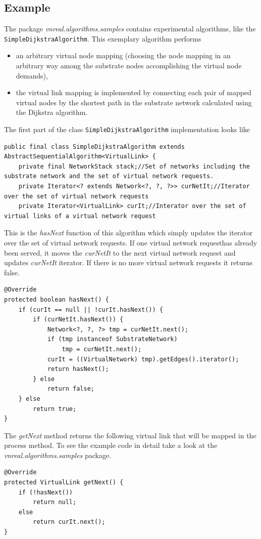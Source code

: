 \subsection{Example}
The package \textit{vnreal.algorithms.samples} contains experimental algorithms, like the \texttt{Simple\-Dijkstra\-Algorithm}. This exemplary algorithm performs
\begin{itemize}
	\item an arbitrary virtual node mapping (choosing the node mapping in an arbitrary way among the substrate nodes accomplishing the virtual node demands), 
	\item the virtual link mapping is implemented by connecting each pair of mapped virtual nodes by the shortest path in the substrate network calculated using the Dijkstra algorithm.
\end{itemize}
The first part of the class \texttt{SimpleDijkstraAlgorithm} implementation looks like
\begin{lstlisting}
public final class SimpleDijkstraAlgorithm extends AbstractSequentialAlgorithm<VirtualLink> {
	private final NetworkStack stack;//Set of networks including the substrate network and the set of virtual network requests.
	private Iterator<? extends Network<?, ?, ?>> curNetIt;//Iterator over the set of virtual network requests
	private Iterator<VirtualLink> curIt;//Interator over the set of virtual links of a virtual network request 
\end{lstlisting}
This is the \textsl{hasNext} function of this algorithm which simply updates the iterator over the set of virtual network requests. If one virtual network requesthas already been served, it moves the \textsl{curNetIt} to the next virtual network request and updates \textsl{curNetIt} iterator. If there is no more virtual network requests it returns false. 
\begin{lstlisting}
@Override
protected boolean hasNext() {
	if (curIt == null || !curIt.hasNext()) {
		if (curNetIt.hasNext()) {
			Network<?, ?, ?> tmp = curNetIt.next();
			if (tmp instanceof SubstrateNetwork)
				tmp = curNetIt.next();
			curIt = ((VirtualNetwork) tmp).getEdges().iterator();
			return hasNext();
		} else
			return false;
	} else
		return true;
}
\end{lstlisting}
The \textsl{getNext} method returns the following virtual link that will be mapped in the process method. To see the example code in detail  take a look at the \textit{vnreal.algorithms.samples} package. 
\begin{lstlisting}
@Override
protected VirtualLink getNext() {
	if (!hasNext())
		return null;
	else
		return curIt.next();
}
\end{lstlisting}